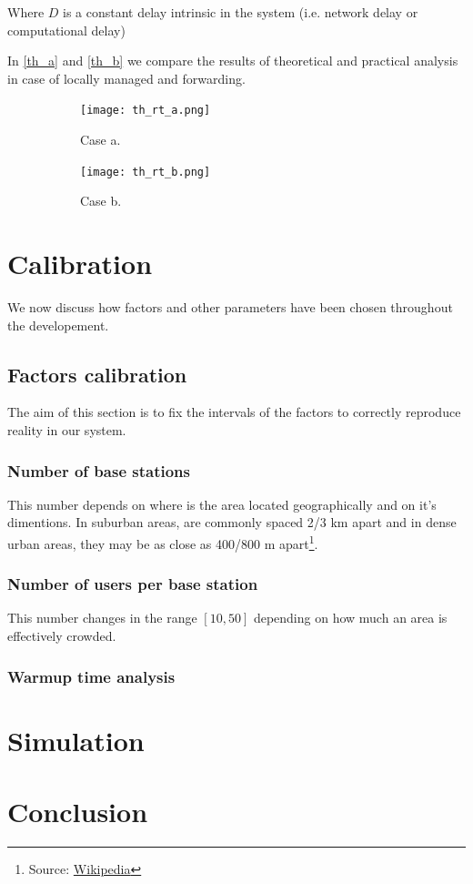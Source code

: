 \documentclass{report}
\begin{document}
Where $D$ is a constant delay intrinsic in the system (i.e. network delay or computational delay)

In \autoref{th_a} and \autoref{th_b} we compare the results of theoretical and practical analysis in case of locally managed and forwarding.

\begin{figure}[H]
    \begin{subfigure}{0.55\textwidth}
        \centering
        \texttt{[image: th\_rt\_a.png]}
        \caption{Case a.}
        \label{th_a}
    \end{subfigure}
    \begin{subfigure}{0.55\textwidth}
        \centering
        \texttt{[image: th\_rt\_b.png]}
        \caption{Case b.}
        \label{th_b}
    \end{subfigure}
    \caption{}
\end{figure}

\chapter{Calibration}
We now discuss how factors and other parameters have been chosen throughout the developement.

\section{Factors calibration}
The aim of this section is to fix the intervals of the factors to correctly reproduce reality in our system.

\subsection{Number of base stations}
This number depends on where is the area located geographically and on it's dimentions.
In suburban areas, are commonly spaced 2/3 km apart and in dense urban areas, they may be as close as 400/800 m apart\footnote{Source: \href{https://en.wikipedia.org/wiki/Cell_site}{Wikipedia}}.

\subsection{Number of users per base station}
This number changes in the range $[10, 50]$ depending on how much an area is effectively crowded.%

\subsection{Warmup time analysis}

\appendix




\chapter{Simulation}
\chapter{Conclusion}
\end{document}
